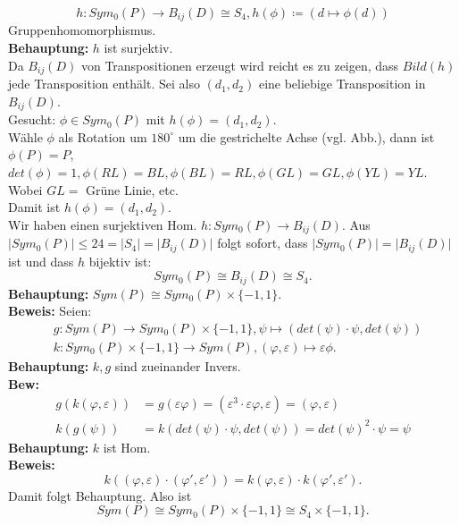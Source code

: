 \begin{problem*}[3]
\begin{equation*}
	h: Sym_0(P) \to B_{ ij }(D) \cong S_4, h(\phi) \coloneqq (d \mapsto \phi(d))
\end{equation*}
Gruppenhomomorphismus.\\
\textbf{Behauptung:} $ h $ ist surjektiv.\\
Da $ B_{ ij }(D)  $ von Transpositionen erzeugt wird reicht es zu zeigen, dass $ Bild(h) $ jede Transposition enthält. Sei also $ (d_1,d_2) $ eine beliebige Transposition in $ B_{ ij }(D)$.\\
Gesucht: $\phi \in Sym_0(P)$ mit $h(\phi) = (d_1,d_2).$\\
Wähle $ \phi $ als Rotation um $ 180^{ \circ } $ um die gestrichelte Achse (vgl. Abb.), dann ist $\phi(P) = P$, $det(\phi) = 1, \phi(RL) = BL, \phi(BL) = RL, \phi(GL) = GL, \phi(YL) = YL$. Wobei $ GL =$ Grüne Linie, etc.\\ 
Damit ist $h(\phi) = (d_1, d_2).$\\
Wir haben einen surjektiven Hom. $h: Sym_0(P) \to B_{ ij }(D)$. Aus $ \vert Sym_0(P) \vert \leq 24 = \vert S_4 \vert = \vert B_{ ij }(D) \vert$ folgt sofort, dass $\vert Sym_0(P) \vert = \vert B_{ ij }(D) \vert$ ist und dass $ h $ bijektiv ist:
\begin{equation*}
	Sym_0(P) \cong B_{ ij }(D) \cong S_4.
\end{equation*}
\textbf{Behauptung:} $Sym(P) \cong Sym_0(P) \times \{ -1, 1 \}.$\\
\textbf{Beweis:} Seien:
\begin{align*}
	&g: Sym(P) \to Sym_0(P) \times \{ -1, 1 \}, \psi \mapsto (det(\psi) \cdot \psi,det(\psi)) \\
	&k: Sym_0(P) \times \{ -1, 1 \} \to Sym(P), (\varphi, \varepsilon) \mapsto \varepsilon \phi.
\end{align*}
\textbf{Behauptung:} $ k,g $ sind zueinander Invers.\\
\textbf{Bew:} 
\begin{align*}
	g(k(\varphi,\varepsilon)) &= g(\varepsilon \varphi) = (\varepsilon^3 \cdot \varepsilon \varphi, \varepsilon) = (\varphi, \varepsilon) 
	\\
	k(g(\psi)) &= k(det(\psi) \cdot \psi, det(\psi) ) = det(\psi)^2 \cdot \psi = \psi
\end{align*}
\textbf{Behauptung:} $ k $ ist Hom.\\
\textbf{Beweis:} 
\begin{equation*}
	k((\varphi, \varepsilon)\cdot (\varphi', \varepsilon')) = k(\varphi, \varepsilon) \cdot k(\varphi',\varepsilon').
\end{equation*}
Damit folgt Behauptung. Also ist 
\begin{equation*}
	Sym(P) \cong Sym_0(P) \times \{ -1, 1 \} \cong S_4 \times \{ -1, 1 \}.
\end{equation*}
\end{problem*}

